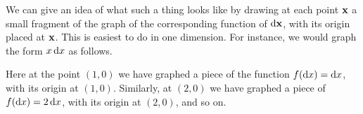 \documentclass[12pt]{amsart}
\begin{document}
We can give an idea of what such a thing looks like by drawing at each point $\mathbf{x}$ a small fragment of the graph of the corresponding function of $\mathrm{d} \mathbf{x}$, with its origin placed at $\mathbf{x}$.
This is easiest to do in one dimension.
For instance, we would graph the form $x\,\mathrm{d} x$ as follows.
\begin{center}
\end{center}
Here at the point $(1,0)$ we have graphed a piece of the function $f(\mathrm{d} x) = \mathrm{d} x$, with its origin at $(1,0)$.
Similarly, at $(2,0)$ we have graphed a piece of $f(\mathrm{d} x) = 2\,\mathrm{d} x$, with its origin at $(2,0)$, and so on.
\end{document}
